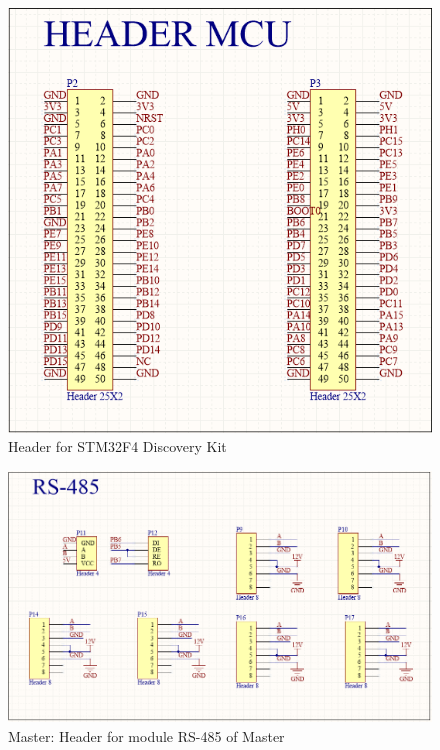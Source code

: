 \begin{figure}[!ht]
  \begin{center}
  \includegraphics[scale=0.8]{images/headerMcu.PNG}
  \caption{Header for STM32F4 Discovery Kit}
  \label{fig:headerMcuFull}
  \end{center}
\end{figure}
\begin{figure}[!ht]
  \begin{center}
  \includegraphics[scale=0.6]{images/header485.PNG}
  \caption{Master: Header for module RS-485 of Master}
  \label{fig:header485Full}
  \end{center}
\end{figure}
